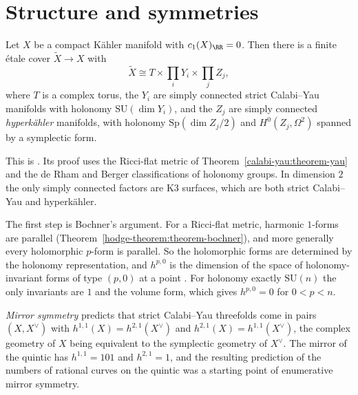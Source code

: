\section{Structure and symmetries}\label{calabi-yau:section-structure}

\begin{theorem}\label{calabi-yau:theorem-beauville-bogomolov}
Let $X$ be a compact K\"ahler manifold with $c_1(X)_\RR = 0$. Then there is a finite \'etale cover $\tilde X \to X$ with
\[
\tilde X \cong T \times \prod_iY_i \times \prod_jZ_j,
\]
where $T$ is a complex torus, the $Y_i$ are simply connected strict Calabi--Yau manifolds with holonomy $\mathrm{SU}(\dim Y_i)$, and the $Z_j$ are simply connected
\emph{hyperk\"ahler} manifolds, with holonomy $\mathrm{Sp}(\dim Z_j/2)$ and $H^0(Z_j, \Omega^2)$ spanned by a symplectic form.
\end{theorem}

This is \cite{beauville-1983}. Its proof uses the Ricci-flat metric of Theorem~\ref{calabi-yau:theorem-yau} and the de Rham and Berger classifications of holonomy
groups. In dimension $2$ the only simply connected factors are K3 surfaces, which are both strict Calabi--Yau and hyperk\"ahler.

\begin{remark}\label{calabi-yau:remark-bochner}
The first step is Bochner's argument. For a Ricci-flat metric, harmonic $1$-forms are parallel (Theorem~\ref{hodge-theorem:theorem-bochner}), and more generally every holomorphic
$p$-form is parallel. So the holomorphic forms are determined by the holonomy representation, and $h^{p,0}$ is the dimension of the space of holonomy-invariant forms of type
$(p, 0)$ at a point \cite{gross-huybrechts-joyce}. For holonomy exactly $\mathrm{SU}(n)$ the only invariants are $1$ and the volume form, which gives $h^{p,0} = 0$ for $0 < p < n$.
\end{remark}

\begin{remark}\label{calabi-yau:remark-mirror-symmetry}
\emph{Mirror symmetry} predicts that strict Calabi--Yau threefolds come in pairs $(X, X^\vee)$ with $h^{1,1}(X) = h^{2,1}(X^\vee)$ and $h^{2,1}(X) = h^{1,1}(X^\vee)$, the
complex geometry of $X$ being equivalent to the symplectic geometry of $X^\vee$. The mirror of the quintic has $h^{1,1} = 101$ and $h^{2,1} = 1$, and the resulting prediction of the
numbers of rational curves on the quintic \cite{candelas-1991} was a starting point of enumerative mirror symmetry.
\end{remark}

